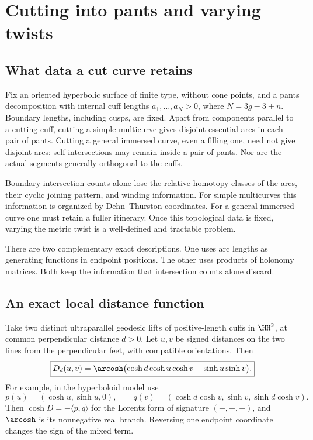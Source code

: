 \section{Cutting into pants and varying twists}
\label{sec:twists}

\subsection{What data a cut curve retains}

Fix an oriented hyperbolic surface of finite type, without cone points,
and a pants decomposition with internal cuff lengths $a_1,\ldots,a_N>0$,
where $N=3g-3+n$. Boundary lengths, including cusps, are fixed.
Apart from components parallel to a cutting cuff, cutting a simple
multicurve gives disjoint essential arcs in each pair of pants.
Cutting a general immersed curve, even a filling one,
need not give disjoint arcs: self-intersections may remain inside a pair
of pants. Nor are the actual segments generally orthogonal to the cuffs.

Boundary intersection counts alone lose the relative homotopy classes of
the arcs, their cyclic joining pattern, and winding information. For simple
multicurves this information is organized by Dehn--Thurston coordinates.
For a general immersed curve one must retain a fuller itinerary. Once this
topological data is fixed, varying the metric twist is a well-defined and
tractable problem.

There are two complementary exact descriptions. One uses arc lengths as
generating functions in endpoint positions. The other uses products of
holonomy matrices. Both keep the information that intersection counts alone
discard.

\subsection{An exact local distance function}

Take two distinct ultraparallel geodesic lifts of positive-length cuffs
in $\HH^2$, at common perpendicular distance $d>0$.
Let $u,v$ be signed distances on the two lines
from the perpendicular feet, with compatible orientations. Then
\begin{equation}
 \boxed{
 D_d(u,v)=\arcosh\bigl(\cosh d\cosh u\cosh v-\sinh u\sinh v\bigr).}
 \label{eq:localdistance}
\end{equation}
For example, in the hyperboloid model use
\[
 p(u)=(\cosh u,\sinh u,0),\qquad
 q(v)=(\cosh d\cosh v,\sinh v,\sinh d\cosh v).
\]
Then $\cosh D=-\langle p,q\rangle$ for the Lorentz form of signature
$(-,+,+)$, and $\arcosh$ is its nonnegative real branch.
Reversing one endpoint coordinate changes the sign of the mixed term.

